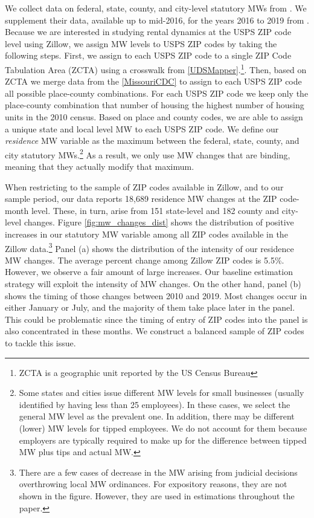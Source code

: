 We collect data on federal, state, county, and city-level statutory MWs from 
\textcite{VaghulZipperer2016}. We supplement their data, available up to mid-2016, 
for the years 2016 to 2019 from \textcite{BerkeleyLaborCenter}. 
Because we are interested in studying rental dynamics at the USPS ZIP code level using Zillow, 
we assign MW levels to USPS ZIP codes by taking the following steps. First, we assign to each USPS 
ZIP code to a single ZIP Code Tabulation Area (ZCTA) using a crosswalk from \ref{UDSMapper}.\footnote{
	ZCTA is a geographic unit reported by the US Census Bureau}. 
Then, based on ZCTA we merge data from the \ref{MissouriCDC} to assign to each USPS ZIP code 
all possible place-county combinations. For each USPS ZIP code we keep only the place-county 
combination that number of housing the highest number of housing units in the 2010 census. 
Based on place and county codes, we are able to assign a unique state and local level MW to each 
USPS ZIP code. We define our \textit{residence} MW variable as the maximum between the 
federal, state, county, and city statutory MWs.\footnote{Some states 
	and cities issue different MW levels for small businesses (usually identified by having 
	less than 25 employees). In these cases, we select the general MW level as the prevalent 
	one. In addition, there may be different (lower) MW levels for tipped employees. We do not 
	account for them because employers are typically required to make up for the difference 
	between tipped MW plus tips and actual MW.}
As a result, we only use MW changes that are binding, meaning that they actually modify 
that maximum.

When restricting to the sample of ZIP codes available in Zillow, and to our sample period, 
our data reports 18,689 residence MW changes at the ZIP code-month level. These, in turn, arise 
from 151 state-level and 182 county and city-level changes. Figure \ref{fig:mw_changes_dist} 
shows the distribution of positive increases in our statutory MW variable among all ZIP 
codes available in the Zillow data.\footnote{There are a few cases of decrease in the 
	MW arising from judicial decisions overthrowing local MW ordinances. For 
	expository reasons, they are not shown in the figure. However, they are 
	used in estimations throughout the paper.} %
Panel (a) shows the distribution of the intensity of our residence MW changes. The average percent 
change among Zillow ZIP codes is 5.5\%. %
However, we observe a fair amount of large increases. Our baseline estimation strategy will
exploit the intensity of MW changes. On the other hand, panel (b) shows the timing of 
those changes between 2010 and 2019. Most changes occur in either January or July, 
and the majority of them take place later in the panel. This could be problematic since
the timing of entry of ZIP codes into the panel is also concentrated in these months. We 
construct a balanced sample of ZIP codes to tackle this issue.

